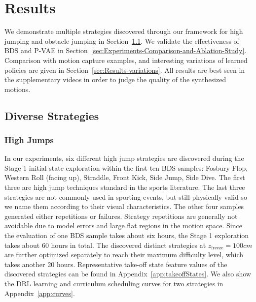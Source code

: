 











\section{Results}
\label{sec:results}

We demonstrate multiple strategies discovered through our framework for high jumping and obstacle jumping in Section~\ref{sec:Experiments-Diverse-Strategies}. We validate the effectiveness of BDS and P-VAE in Section~\ref{sec:Experiments-Comparison-and-Ablation-Study}. Comparison with motion capture examples, and interesting variations of learned policies are given in Section~\ref{sec:Results-variations}. All results are best seen in the supplementary videos in order to judge the quality of the synthesized motions.

\subsection{Diverse Strategies}
\label{sec:Experiments-Diverse-Strategies}

\subsubsection{High Jumps}\label{sec:results:high-jump}
In our experiments, six different high jump strategies are discovered during the Stage 1 initial state exploration within the first ten BDS samples: Fosbury Flop, Western Roll (facing up), Straddle, Front Kick, Side Jump, Side Dive. The first three are high jump techniques standard in the sports literature. The last three strategies are not commonly used in sporting events, but still physically valid so we name them according to their visual characteristics. The other four samples generated either repetitions or failures. Strategy repetitions are generally not avoidable due to model errors and large flat regions in the motion space. Since the evaluation of one BDS sample takes about six hours, the Stage 1 exploration takes about 60 hours in total. The discovered distinct strategies at $z_\text{freeze}=100cm$ are further optimized separately to reach their maximum difficulty level, which takes another 20 hours. Representative take-off state feature values of the discovered strategies can be found in Appendix~\ref{app:takeoffStates}. {We also show the DRL learning and curriculum scheduling curves for two strategies in Appendix~\ref{app:curves}.}

